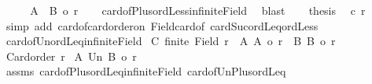 \begin{isabellebody}
\ \ \isamarkupfalse%
\ \isamarkupfalse%
\ {\isachardoublequoteopen}{\isacharbar}{\kern0pt}A\ {\isacharless}{\kern0pt}{\isacharplus}{\kern0pt}{\isachargreater}{\kern0pt}\ B{\isacharbar}{\kern0pt}\ {\isacharless}{\kern0pt}o\ {\isacharquery}{\kern0pt}r{\isacharprime}{\kern0pt}{\isachardoublequoteclose}\isanewline
\ \ \isamarkupfalse%
\ card{\isacharunderscore}{\kern0pt}of{\isacharunderscore}{\kern0pt}Plus{\isacharunderscore}{\kern0pt}ordLess{\isacharunderscore}{\kern0pt}infinite{\isacharunderscore}{\kern0pt}Field\ \isamarkupfalse%
\ blast\isanewline
\ \ \isamarkupfalse%
\ {\isacharquery}{\kern0pt}thesis\ \isamarkupfalse%
\ c\ r\isanewline
\ \ \isamarkupfalse%
\ {\isacharparenleft}{\kern0pt}simp\ add{\isacharcolon}{\kern0pt}\ card{\isacharunderscore}{\kern0pt}of{\isacharunderscore}{\kern0pt}card{\isacharunderscore}{\kern0pt}order{\isacharunderscore}{\kern0pt}on\ Field{\isacharunderscore}{\kern0pt}card{\isacharunderscore}{\kern0pt}of\ cardSuc{\isacharunderscore}{\kern0pt}ordLeq{\isacharunderscore}{\kern0pt}ordLess{\isacharparenright}{\kern0pt}\isanewline
{}\isamarkupfalse%
%
\endisatagproof
{\isafoldproof}%
%
\isadelimproof
\isanewline
%
\endisadelimproof
\isanewline
{}\isamarkupfalse%
\ card{\isacharunderscore}{\kern0pt}of{\isacharunderscore}{\kern0pt}Un{\isacharunderscore}{\kern0pt}ordLeq{\isacharunderscore}{\kern0pt}infinite{\isacharunderscore}{\kern0pt}Field{\isacharcolon}{\kern0pt}\isanewline
{}\ C{\isacharcolon}{\kern0pt}\ {\isachardoublequoteopen}{\isasymnot}finite\ {\isacharparenleft}{\kern0pt}Field\ r{\isacharparenright}{\kern0pt}{\isachardoublequoteclose}\ \ A{\isacharcolon}{\kern0pt}\ {\isachardoublequoteopen}{\isacharbar}{\kern0pt}A{\isacharbar}{\kern0pt}\ {\isasymle}o\ r{\isachardoublequoteclose}\ \ B{\isacharcolon}{\kern0pt}\ {\isachardoublequoteopen}{\isacharbar}{\kern0pt}B{\isacharbar}{\kern0pt}\ {\isasymle}o\ r{\isachardoublequoteclose}\isanewline
{}\ {\isachardoublequoteopen}Card{\isacharunderscore}{\kern0pt}order\ r{\isachardoublequoteclose}\isanewline
{}\ {\isachardoublequoteopen}{\isacharbar}{\kern0pt}A\ Un\ B{\isacharbar}{\kern0pt}\ {\isasymle}o\ r{\isachardoublequoteclose}\isanewline
%
\isadelimproof
%
\endisadelimproof
%
\isatagproof
{}\isamarkupfalse%
\ assms\ card{\isacharunderscore}{\kern0pt}of{\isacharunderscore}{\kern0pt}Plus{\isacharunderscore}{\kern0pt}ordLeq{\isacharunderscore}{\kern0pt}infinite{\isacharunderscore}{\kern0pt}Field\ card{\isacharunderscore}{\kern0pt}of{\isacharunderscore}{\kern0pt}Un{\isacharunderscore}{\kern0pt}Plus{\isacharunderscore}{\kern0pt}ordLeq\isanewline

\end{isabellebody}
